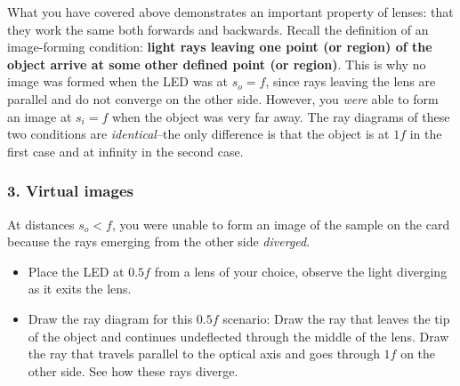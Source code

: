 \documentclass[a4paper]{report}
\begin{document}
What you have covered above demonstrates an important property of lenses: that they work the same both forwards and backwards.
Recall the definition of an image-forming condition: \textbf{light rays leaving one point (or region) of the object arrive at some other defined point (or region)}.
This is why no image was formed when the LED was at $s_o=f$, since rays leaving the lens are parallel and do not converge on the other side. 
However, you \textit{were} able to form an image at $s_i=f$ when the object was very far away. 
The ray diagrams of these two conditions are \textit{identical}--the only difference is that the object is at $1f$ in the first case and at infinity in the second case.

\clearpage


\subsubsection{3. Virtual images}
At distances $s_o<f$, you were unable to form an image of the sample on the card because the rays emerging from the other side \textit{diverged}.
\begin{itemize}
\item Place the LED at $0.5f$ from a lens of your choice, observe the light diverging as it exits the lens.
\item Draw the ray diagram for this $0.5f$ scenario:
Draw the ray that leaves the tip of the object and continues undeflected through the middle of the lens. 
Draw the ray that travels parallel to the optical axis and goes through $1f$ on the other side.
See how these rays diverge. 
\end{itemize}
\end{document}
